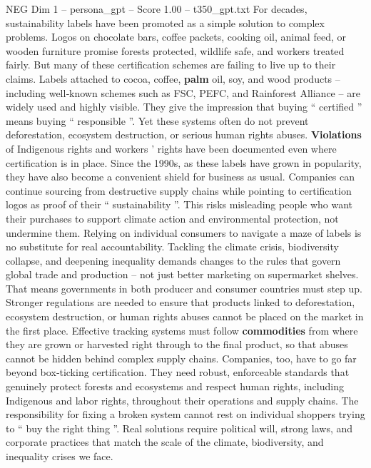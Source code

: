 \begin{textsample}{NEG Dim 1 – persona\_gpt – Score 1.00 – t350\_gpt.txt}  \label{ex:f1_neg_037}
For decades, sustainability labels have been promoted as a simple solution to complex problems.
Logos on chocolate bars, coffee packets, cooking oil, animal feed, or wooden furniture promise forests protected, wildlife safe, and workers treated fairly.
But many of these certification schemes are failing to live up to their claims.
Labels attached to cocoa, coffee, \textbf{palm} oil, soy, and wood products – including well‑known schemes such as FSC, PEFC, and Rainforest Alliance – are widely used and highly visible.
They give the impression that buying “ certified ” means buying “ responsible ”.
Yet these systems often do not prevent deforestation, ecosystem destruction, or serious human rights abuses. \textbf{Violations} of Indigenous rights and workers ’ rights have been documented even where certification is in place.
Since the 1990s, as these labels have grown in popularity, they have also become a convenient shield for business as usual.
Companies can continue sourcing from destructive supply chains while pointing to certification logos as proof of their “ sustainability ”.
This risks misleading people who want their purchases to support climate action and environmental protection, not undermine them.
Relying on individual consumers to navigate a maze of labels is no substitute for real accountability.
Tackling the climate crisis, biodiversity collapse, and deepening inequality demands changes to the rules that govern global trade and production – not just better marketing on supermarket shelves.
That means governments in both producer and consumer countries must step up.
Stronger regulations are needed to ensure that products linked to deforestation, ecosystem destruction, or human rights abuses cannot be placed on the market in the first place.
Effective tracking systems must follow \textbf{commodities} from where they are grown or harvested right through to the final product, so that abuses cannot be hidden behind complex supply chains.
Companies, too, have to go far beyond box‑ticking certification.
They need robust, enforceable standards that genuinely protect forests and ecosystems and respect human rights, including Indigenous and labor rights, throughout their operations and supply chains.
The responsibility for fixing a broken system cannot rest on individual shoppers trying to “ buy the right thing ”.
Real solutions require political will, strong laws, and corporate practices that match the scale of the climate, biodiversity, and inequality crises we face.

\end{textsample}
